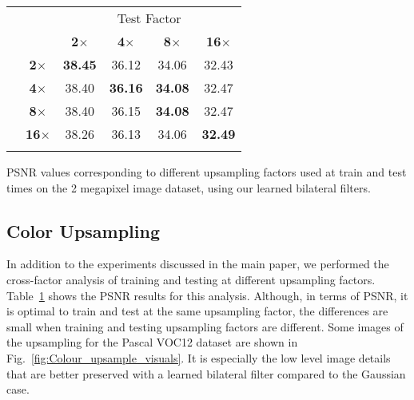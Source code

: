 \begin{table}[t]
  \scriptsize
  \centering
    \begin{tabular}{c c c c c c}
      \toprule
      & & \multicolumn{4}{c}{Test Factor} \\ [0.1cm]
     & & \textbf{2$\times$} & \textbf{4$\times$} & \textbf{8$\times$} & \textbf{16$\times$} \\ [0.15cm]
    \parbox[t]{3mm}{} & \textbf{2$\times$} & \textbf{38.45} & 36.12  & 34.06 & 32.43 \\ [0.1cm]
     & \textbf{4$\times$} & 38.40 & \textbf{36.16} & \textbf{34.08} & 32.47 \\ [0.1cm]
     & \textbf{8$\times$} & 38.40 & 36.15  & \textbf{34.08} & 32.47 \\ [0.1cm]
     & \textbf{16$\times$} & 38.26 & 36.13  & 34.06 & \textbf{32.49} \\
      \bottomrule
      \\
    \end{tabular}
      \vspace{-0.2cm}
     {PSNR values corresponding to different upsampling factors used at train and test times on the 2 megapixel image dataset, using our learned bilateral filters.}
\label{tbl:crossupsample}
\vspace{-0.4cm}
\end{table}

\subsection{Color Upsampling}\label{sec:color_upsampling}

In addition to the experiments discussed in the main paper, we performed
the cross-factor analysis of training and testing at different upsampling
factors. Table~\ref{tbl:crossupsample} shows the PSNR results for this
analysis. Although, in terms of PSNR, it is optimal to train and test at the
same upsampling factor, the differences are small when training and testing
upsampling factors are different. Some images of the upsampling for the Pascal
VOC12 dataset are shown in Fig.~\ref{fig:Colour_upsample_visuals}. It is
especially the low level image details that are better preserved with
a learned bilateral filter compared to the Gaussian case.

